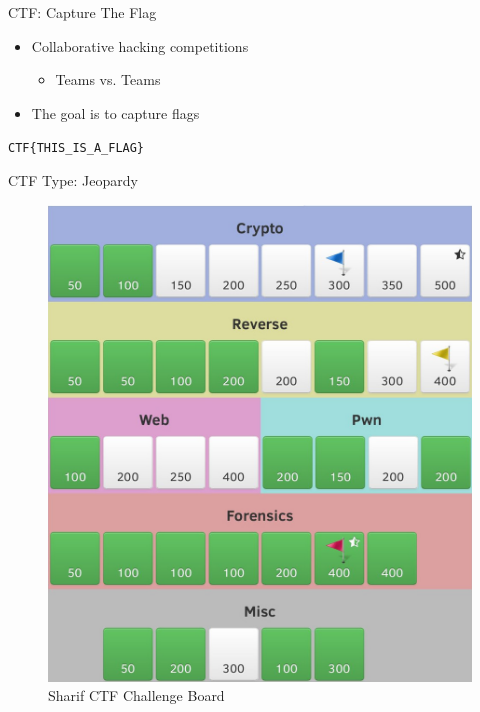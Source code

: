 {
\begin{frame}[t,plain]
    \titlepage
\end{frame}
}

\begin{frame}[fragile]
  {CTF: Capture The Flag}

  \begin{itemize}
    \item Collaborative hacking competitions
    \begin{itemize}
    	\item Teams vs. Teams
    \end{itemize}
    \item The goal is to capture flags
  \end{itemize}
\end{frame}

\begin{frame}
	\begin{center}
		\Huge\verb+CTF{THIS_IS_A_FLAG}+
	\end{center}
\end{frame}


\begin{frame}
  {CTF Type: Jeopardy}

  \begin{figure}[h]
    \centering
    \includegraphics[height=0.8\textheight]{../images/sharifctf-challenges.jpg}
    \caption{\footnotesize{}Sharif CTF Challenge Board}
    \label{fig:jeopardyboard}
  \end{figure}
\end{frame}

